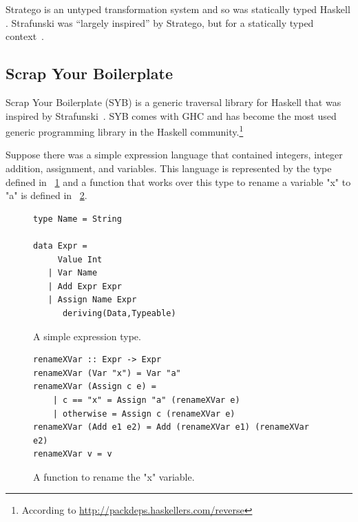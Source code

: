 Stratego is an untyped transformation system and so was \DIFdelbegin {}\DIFdelend \DIFaddbegin {}\DIFaddend statically typed Haskell \DIFaddbegin {}\DIFaddend . Strafunski was ``largely inspired'' by Stratego, but for a statically typed context~\citep{strafunski}.

\subsection{Scrap Your Boilerplate}\label{syb}

	Scrap Your Boilerplate (SYB) is a generic traversal library for Haskell that was inspired by Strafunski~\citep{syb}. SYB comes with GHC and has become the most used generic programming library in the Haskell community.\footnote{According to \url{http://packdeps.haskellers.com/reverse}} 

	Suppose there was a simple expression language that contained integers, integer addition, assignment, and variables. This language is represented by the type defined in \DIFdelbegin {}\DIFdelend \DIFaddbegin {}\DIFaddend ~\ref{expression} and a function that works over this type to rename a variable "x" to "a" is defined in \DIFdelbegin {}\DIFdelend \DIFaddbegin {}\DIFaddend ~\ref{renamexvar}.

	\begin{figure}[t]
	\begin{lstlisting}
type Name = String

data Expr =
     Value Int
   | Var Name
   | Add Expr Expr
   | Assign Name Expr
      deriving(Data,Typeable)
	\end{lstlisting}
	\caption{A simple expression type.}
	\label{expression}
	\end{figure}

	\begin{figure}[t]
	\begin{lstlisting}
renameXVar :: Expr -> Expr
renameXVar (Var "x") = Var "a"
renameXVar (Assign c e) = 
	| c == "x" = Assign "a" (renameXVar e)
	| otherwise = Assign c (renameXVar e)
renameXVar (Add e1 e2) = Add (renameXVar e1) (renameXVar e2)
renameXVar v = v
	\end{lstlisting}
	\caption{A function to rename the "x" variable.}
	\label{renamexvar}
	\end{figure}

